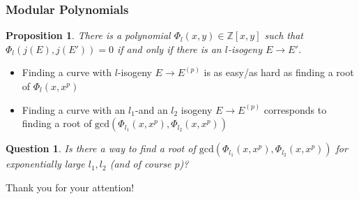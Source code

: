 \documentclass{beamer}
\newcommand{\Z}{\mathbb{Z}}
\newtheorem{proposition}{Proposition}
\newtheorem{question}{Question}
\begin{document}
\begin{frame}
    \frametitle{Modular Polynomials}

    \begin{proposition}
        There is a polynomial $\Phi_l(x, y) \in \Z[x, y]$ such that $\Phi_l(j(E), j(E')) = 0$ if and only if there is an $l$-isogeny $E \to E'$.
    \end{proposition}
    \pause
    \begin{itemize}[<+->]
        \item Finding a curve with $l$-isogeny $E \to E^{(p)}$ is as easy/as hard as finding a root of $\Phi_l(x, x^p)$
        \item Finding a curve with an $l_1$-and an $l_2$ isogeny $E \to E^{(p)}$ corresponds to finding a root of $\mathrm{gcd}(\Phi_{l_1}(x, x^p), \Phi_{l_2}(x, x^p))$
    \end{itemize}
    \pause
    \begin{question}
        Is there a way to find a root of $\mathrm{gcd}(\Phi_{l_1}(x, x^p), \Phi_{l_2}(x, x^p))$ for exponentially large $l_1, l_2$ (and of course $p$)?
    \end{question}
\end{frame}

\begin{frame}
    \begin{center}
        \Huge
        Thank you for your attention!
    \end{center}
    \printbibliography
\end{frame}
\end{document}
